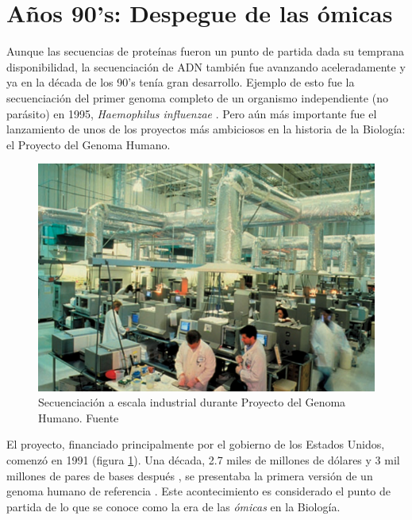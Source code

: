 \section{Años 90's: Despegue de las ómicas}

Aunque las secuencias de proteínas fueron un punto de partida dada su temprana disponibilidad, la secuenciación de ADN también fue avanzando aceleradamente y ya en la década de los 90's tenía gran desarrollo.
Ejemplo de esto fue la secuenciación del primer genoma completo de un organismo independiente (no parásito) en 1995, \textit{Haemophilus influenzae} \cite{fleischmannWholegenomeRandomSequencing1995}.
Pero aún más importante fue el lanzamiento de unos de los proyectos más ambiciosos en la historia de la Biología: el Proyecto del Genoma Humano.

\begin{figure}[tb]
  \centering
  \includegraphics[width=0.7\columnwidth]{images/human_genome_project.png}
  \caption{Secuenciación a escala industrial durante Proyecto del Genoma Humano. Fuente \cite{gauthierBriefHistoryBioinformatics2019}}
  \label{fig:human_genome_project}
\end{figure}

El proyecto, financiado principalmente por el gobierno de los Estados Unidos, comenzó en 1991 (figura \ref{fig:human_genome_project}).
Una década, 2.7 miles de millones de dólares y 3 mil millones de pares de bases después \cite{web:HGP_FAQ}, se presentaba la primera versión de un genoma humano de referencia \cite{internationalhumangenomesequencingconsortiumFinishingEuchromaticSequence2004}.
Este acontecimiento es considerado el punto de partida de lo que se conoce como la era de las \textit{ómicas} en la Biología.


